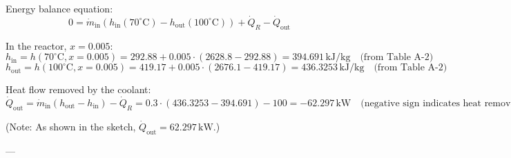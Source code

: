 Energy balance equation:  
\[
0 = \dot{m}_{\text{in}} \left( h_{\text{in}}(70^\circ\text{C}) - h_{\text{out}}(100^\circ\text{C}) \right) + \dot{Q}_R - \dot{Q}_{\text{out}}
\]  

In the reactor, \( x = 0.005 \):  
\[
h_{\text{in}} = h(70^\circ\text{C}, x=0.005) = 292.88 + 0.005 \cdot (2628.8 - 292.88) = 394.691 \, \text{kJ/kg} \quad \text{(from Table A-2)}
\]  
\[
h_{\text{out}} = h(100^\circ\text{C}, x=0.005) = 419.17 + 0.005 \cdot (2676.1 - 419.17) = 436.3253 \, \text{kJ/kg} \quad \text{(from Table A-2)}
\]  

Heat flow removed by the coolant:  
\[
\dot{Q}_{\text{out}} = \dot{m}_{\text{in}} \left( h_{\text{out}} - h_{\text{in}} \right) - \dot{Q}_R = 0.3 \cdot (436.3253 - 394.691) - 100 = -62.297 \, \text{kW} \quad \text{(negative sign indicates heat removed)}
\]  

(Note: As shown in the sketch, \( \dot{Q}_{\text{out}} = 62.297 \, \text{kW} \).)  

---